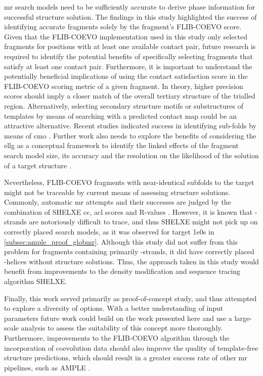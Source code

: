 \Gls{mr} search models need to be sufficiently accurate to derive phase information for successful structure solution. The findings in this study highlighted the success of identifying accurate fragments solely by the fragment's FLIB-COEVO score. Given that the FLIB-COEVO implementation used in this study only selected fragments for positions with at least one available contact pair, future research is required to identify the potential benefits of specifically selecting fragments that satisfy at least one contact pair. Furthermore, it is important to understand the potentially beneficial implications of using the contact satisfaction score in the FLIB-COEVO scoring metric of a given fragment. In theory, higher precision scores should imply a closer match of the overall tertiary structure of the trialled region. Alternatively, selecting secondary structure motifs or substructures of templates by means of searching with a predicted contact map could be an attractive alternative. Recent studies indicated success in identifying sub-folds by means of \gls{cmo} \cite{Buchan2017-ox,Ovchinnikov2017-nd}. Further work also needs to explore the benefits of considering the \gls{ellg} as a conceptual framework to identify the linked effects of the fragment search model size, its accuracy and the resolution on the likelihood of the solution of a target structure \cite{McCoy2017-cz}.

Nevertheless, FLIB-COEVO fragments with near-identical subfolds to the target might not be traceable by current means of assessing structure solutions. Commonly, automatic \gls{mr} attempts and their successes are judged by the combination of SHELXE \gls{cc}, \gls{acl} scores and R-values \cite{Thorn2013-le}. However, it is known that \textbeta-strands are notoriously difficult to trace, and thus SHELXE might not pick up on correctly placed search models, as it was observed for target 1e0s in \cref{subsec:ample_proof_globmr}. Although this study did not suffer from this problem for fragments containing primarily \textbeta-strands, it did have correctly placed \textalpha-helices without structure solutions. Thus, the approach taken in this study would benefit from improvements to the density modification and sequence tracing algorithm SHELXE.

Finally, this work served primarily as proof-of-concept study, and thus attempted to explore a diversity of options. With a better understanding of input parameters future work could build on the work presented here and use a large-scale analysis to assess the suitability of this concept more thoroughly. Furthermore, improvements to the FLIB-COEVO algorithm through the incorporation of coevolution data should also improve the quality of template-free structure predictions, which should result in a greater success rate of other \gls{mr} pipelines, such as AMPLE \cite{Bibby2012-lm}.
